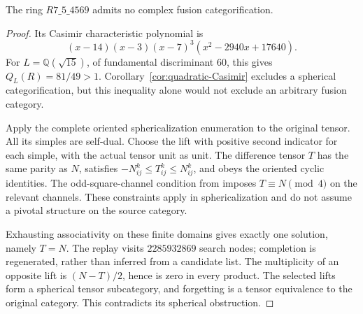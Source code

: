 \begin{proposition}\label{prop:m5-signed-compression}
The ring $R7\_5\_4569$ admits no complex fusion categorification.
\end{proposition}
\begin{proof}
Its Casimir characteristic polynomial is
\[
 (x-14)(x-3)(x-7)^3(x^2-2940x+17640).
\]
For $L=\mathbb Q(\sqrt{15})$, of fundamental discriminant $60$, this
gives $Q_L(R)=81/49>1$.  Corollary~\ref{cor:quadratic-Casimir} excludes
a spherical categorification, but this inequality alone would not
exclude an arbitrary fusion category.

Apply the complete oriented sphericalization enumeration to the original
tensor.  All its simples are self-dual.  Choose the lift with positive
second indicator for each simple, with the actual tensor unit as unit.
The difference tensor $T$ has the same parity as $N$, satisfies
$-N_{ij}^k\leq T_{ij}^k\leq N_{ij}^k$, and obeys the oriented cyclic
identities.  The odd-square-channel condition from
\cite[Theorem~3.9]{TPE} imposes $T\equiv N\pmod4$ on the relevant
channels.  These constraints apply in sphericalization and do not
assume a pivotal structure on the source category.

Exhausting associativity on these finite domains gives exactly one
solution, namely $T=N$.  The replay visits $2285932869$ search nodes;
completion is regenerated, rather than inferred from a candidate list.
The multiplicity of an opposite lift is $(N-T)/2$, hence is zero in every
product.  The selected lifts form a spherical tensor subcategory, and
forgetting is a tensor equivalence to the original category.  This
contradicts its spherical obstruction.
\end{proof}

